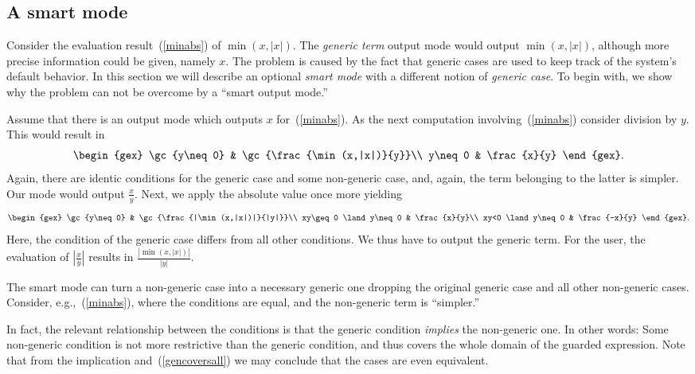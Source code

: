 \subsection{A smart mode}\label{smartmode}
Consider the evaluation result~(\ref{minabs}) of $\min(x,|x|)$. The
{\em generic term} output mode would output $\min(x,|x|)$, although
more precise information could be given, namely $x$. The problem is
caused by the fact that generic cases are used to keep track of the
system's default behavior. In this section we will describe an
optional {\em smart mode} with a different notion of {\em generic
case}. To begin with, we show why the problem can not be overcome by a
``smart output mode.''

Assume that there is an output mode which outputs $x$
for~(\ref{minabs}). As the next computation involving~(\ref{minabs})
consider division by $y$. This would result in
$$
\begin{gex}
\gc{y\neq0} & \gc{\frac{\min(x,|x|)}{y}}\\
y\neq0 & \frac{x}{y}
\end{gex}.
$$
Again, there are identic conditions for the generic case and some
non-generic case, and, again, the term belonging to the latter is
simpler. Our mode would output $\frac{x}{y}$. Next, we apply the
absolute value once more yielding
$$
\begin{gex}
\gc{y\neq 0} & \gc{\frac{|\min(x,|x|)|}{|y|}}\\
xy\geq0 \land y\neq0 & \frac{x}{y}\\
xy<0 \land y\neq0 & \frac{-x}{y}
\end{gex}.
$$
Here, the condition of the generic case differs from all other
conditions. We thus have to output the generic term. For the user, the
evaluation of $|\frac{x}{y}|$ results in $\frac{|\min(x,|x|)|}{|y|}$.

The smart mode can turn a non-generic case into a necessary generic
one dropping the original generic case and all other non-generic
cases. Consider, e.g.,~(\ref{minabs}), where the conditions are equal,
and the non-generic term is ``simpler.''

In fact, the relevant relationship between the conditions is that the
generic condition {\em implies} the non-generic one. In other words:
Some non-generic condition is not more restrictive than the generic
condition, and thus covers the whole domain of the guarded expression.
Note that from the implication and~(\ref{gencoversall}) we may
conclude that the cases are even equivalent.

